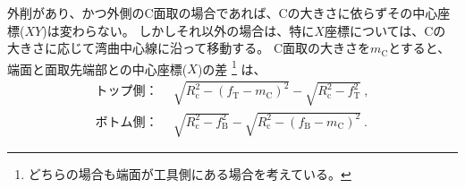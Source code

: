 外削があり、かつ外側のC面取の場合であれば、Cの大きさに依らずその中心座標($XY$)は変わらない。
しかしそれ以外の場合は、特に$X$座標については、Cの大きさに応じて湾曲中心線に沿って移動する。
C面取の大きさを$m_\mathrm C$とすると、端面と面取先端部との中心座標($X$)の差
\footnote{どちらの場合も端面が工具側にある場合を考えている。}
は、
\begin{align*}
  \text{トップ側：}&~~
  \sqrt{R_\mathrm c^2-\left(f_\mathrm T-m_\mathrm C\right)^2}-\sqrt{R_\mathrm c^2-f_\mathrm T^2}\ ,\\
  \text{ボトム側：}&~~
  \sqrt{R_\mathrm c^2-f_\mathrm B^2}-\sqrt{R_\mathrm c^2-\left(f_\mathrm B-m_\mathrm C\right)^2}\ .
\end{align*}


